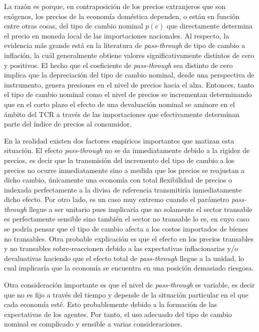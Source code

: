 \documentclass[12pt,letterpaper]{article}
\begin{document}
La razón es porque, en contraposición de los precios extranjeros que son exógenos, los precios de la economía doméstica dependen, o están en función entre otras cosas, del tipo de cambio nominal $p(e)$ que directamente determina el precio en moneda local de las importaciones nacionales. Al respecto, la evidencia más grande está en la literatura de \emph{pass-through} de tipo de cambio a inflación, la cuál generalmente obtiene valores significativamente distintos de cero y positivos. El hecho que el coeficiente de \emph{pass-through} sea distinto de cero implica que la depreciación del tipo de cambio nominal, desde una perspectiva de instrumento, genera presiones en el nivel de precios hacia el alza. Entonces, tanto el tipo de cambio nominal como el nivel de precios se incrementan determinando que en el corto plazo el efecto de una devaluación nominal se aminore en el ámbito del TCR a través de las importaciones que efectivamente determinan parte del índice de precios al consumidor.

En la realidad existen dos factores empíricos importantes que matizan esta situación. El efecto \emph{pass-through} no se da inmediatamente debido a la rigidez de precios, es decir que la transmisión del incremento del tipo de cambio a los precios no ocurre inmediatamente sino a medida que los precios se reajustan a dicho cambio, únicamente una economía con total flexibilidad de precios o indexada perfectamente a la divisa de referencia transmitiría inmediatamente dicho efecto. Por otro lado, es un caso muy extremo cuando el parámetro \emph{pass-through} llegue a ser unitario pues implicaría que no solamente el sector transable es perfectamente sensible sino también el sector no transable lo es, en cuyo caso se podría pensar que el tipo de cambio afecta a los costos importados de bienes no transables. Otra probable explicación es que el efecto en los precios transables y no transables sobre-reaccionen debido a las expectativas inflacionarias y/o devaluativas haciendo que el efecto total de \emph{pass-through} llegue a la unidad, lo cual implicaría que la economía se encuentra en una posición demasiado riesgosa.

Otra consideración importante es que el nivel de \emph{pass-through} es variable, es decir que no es fijo a través del tiempo y depende de la situación particular en el que cada economía esté. Esto probablemente debido a la formación de las expectativas de los agentes. Por tanto, el uso adecuado del tipo de cambio nominal es complicado y sensible a varias consideraciones.
\end{document}
